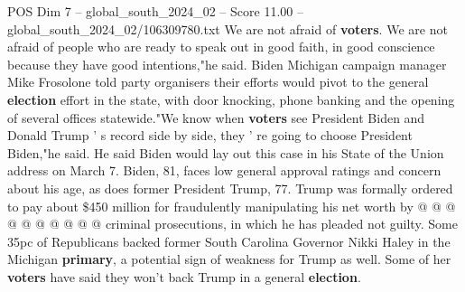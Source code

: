 \begin{textsample}{POS Dim 7 – global\_south\_2024\_02 – Score 11.00 – global\_south\_2024\_02/106309780.txt}
We are not afraid of \textbf{voters}.
We are not afraid of people who are ready to speak out in good faith, in good conscience because they have good intentions,"he said.
Biden Michigan campaign manager Mike Frosolone told party organisers their efforts would pivot to the general \textbf{election} effort in the state, with door knocking, phone banking and the opening of several offices statewide."We know when \textbf{voters} see President Biden and Donald Trump ' s record side by side, they ' re going to choose President Biden,"he said.
He said Biden would lay out this case in his State of the Union address on March 7.
Biden, 81, faces low general approval ratings and concern about his age, as does former President Trump, 77.
Trump was formally ordered to pay about \$450 million for fraudulently manipulating his net worth by @ @ @ @ @ @ @ @ @ @ criminal prosecutions, in which he has pleaded not guilty.
Some 35pc of Republicans backed former South Carolina Governor Nikki Haley in the Michigan \textbf{primary}, a potential sign of weakness for Trump as well.
Some of her \textbf{voters} have said they won't back Trump in a general \textbf{election}.

\end{textsample}
